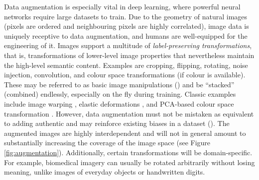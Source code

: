 Data augmentation is especially vital in deep learning, where powerful neural networks require large datasets to train. Due to the geometry of natural images (pixels are ordered and neighbouring pixels are highly correlated), image data is uniquely receptive to data augmentation, and humans are well-equipped for the engineering of it. Images support a multitude of \emph{label-preserving transformations}, that is, transformations of lower-level image properties that nevertheless maintain the high-level semantic content. Examples are cropping, flipping, rotating, noise injection, convolution, and colour space transformations (if colour is available). These may be referred to as basic image manipulations (\cite{shorten2019survey}) and be ``stacked'' (combined) endlessly, especially on the fly during training. Classic examples include image warping \cite{lecun1998gradient}, elastic deformations \cite{simard2003best}, and PCA-based colour space transformation \cite{krizhevsky2012imagenet}. However, data augmentation must not be mistaken as equivalent to adding authentic and may reinforce existing biases in a dataset (\cite{shorten2019survey}). The augmented images are highly interdependent and will not in general amount to substantially increasing the coverage of the image space (see Figure \ref{fig:augmentation}). Additionally, certain transformations will be domain-specific. For example, biomedical imagery can usually be rotated arbitrarily without losing meaning, unlike images of everyday objects or handwritten digits.

